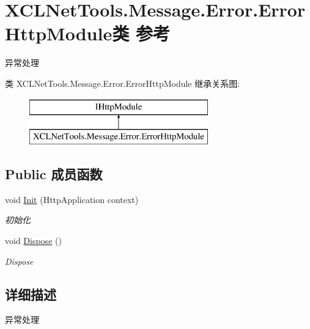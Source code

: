 \hypertarget{class_x_c_l_net_tools_1_1_message_1_1_error_1_1_error_http_module}{}\section{X\+C\+L\+Net\+Tools.\+Message.\+Error.\+Error\+Http\+Module类 参考}
\label{class_x_c_l_net_tools_1_1_message_1_1_error_1_1_error_http_module}


异常处理  


类 X\+C\+L\+Net\+Tools.\+Message.\+Error.\+Error\+Http\+Module 继承关系图\+:\begin{figure}[H]
\begin{center}
\leavevmode
\includegraphics[height=2.000000cm]{class_x_c_l_net_tools_1_1_message_1_1_error_1_1_error_http_module}
\end{center}
\end{figure}
\subsection*{Public 成员函数}
\begin{DoxyCompactItemize}
\item 
void \hyperlink{class_x_c_l_net_tools_1_1_message_1_1_error_1_1_error_http_module_aa4e06d53382795826ed453b62afa265d}{Init} (Http\+Application context)
\begin{DoxyCompactList}\small\item\em 初始化 \end{DoxyCompactList}\item 
void \hyperlink{class_x_c_l_net_tools_1_1_message_1_1_error_1_1_error_http_module_a796d6d747b8620b5e260858e05abd09f}{Dispose} ()
\begin{DoxyCompactList}\small\item\em Dispose \end{DoxyCompactList}\end{DoxyCompactItemize}


\subsection{详细描述}
异常处理 



